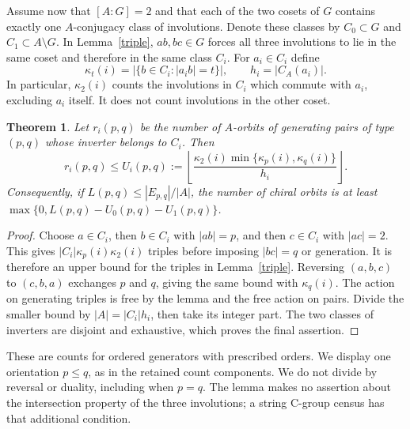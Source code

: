 \documentclass[11pt,a4paper]{article}
\newtheorem{theorem}{Theorem}\newtheorem{lemma}[theorem]{Lemma}
\begin{document}
Assume now that $[A:G]=2$ and that each of the two cosets of $G$
contains exactly one $A$-conjugacy class of involutions. Denote these
classes by $C_0\subset G$ and $C_1\subset A\setminus G$.
In Lemma~\ref{triple}, $ab,bc\in G$ forces all three involutions
to lie in the same coset and therefore in the same class $C_i$.
For $a_i\in C_i$ define
\[
 \kappa_t(i)=|\{b\in C_i:|a_i b|=t\}|,
 \qquad h_i=|C_A(a_i)|.
\]
In particular, $\kappa_2(i)$ counts the involutions in $C_i$
which commute with $a_i$, excluding $a_i$ itself. It does not count
involutions in the other coset.

\begin{theorem}\label{bound}
Let $r_i(p,q)$ be the number of $A$-orbits of generating pairs of type
$(p,q)$ whose inverter belongs to $C_i$. Then
\[
 r_i(p,q)\leq
 U_i(p,q):=\left\lfloor
 \frac{\kappa_2(i)\min\{\kappa_p(i),\kappa_q(i)\}}{h_i}
 \right\rfloor.                                      \tag{1}
\]
Consequently, if $L(p,q)\leq |E_{p,q}|/|A|$, the number of chiral
orbits is at least $\max\{0,L(p,q)-U_0(p,q)-U_1(p,q)\}$.
\end{theorem}
\begin{proof}
Choose $a\in C_i$, then $b\in C_i$ with $|ab|=p$, and then
$c\in C_i$ with $|ac|=2$. This gives
$|C_i|\kappa_p(i)\kappa_2(i)$ triples before imposing $|bc|=q$
or generation. It is therefore an upper bound for the triples in
Lemma~\ref{triple}. Reversing $(a,b,c)$ to $(c,b,a)$ exchanges $p$
and $q$, giving the same bound with $\kappa_q(i)$. The action on
generating triples is free by the lemma and the free action on pairs.
Divide the smaller bound by $|A|=|C_i|h_i$, then take its integer
part. The two classes of inverters are disjoint and exhaustive, which
proves the final assertion.
\end{proof}
These are counts for ordered generators with prescribed orders. We
display one orientation $p\leq q$, as in the retained count components.
We do not divide by reversal or duality, including when $p=q$.
The lemma makes no assertion about the intersection property of the
three involutions; a string C-group census has that additional condition.
\end{document}
